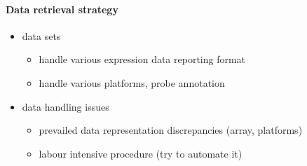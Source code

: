 






\paragraph{Data retrieval strategy}
%
%
\begin{itemize}
\item data sets
  \begin{itemize}
    \item handle various expression data reporting format
    \item handle various platforms, probe annotation
  \end{itemize}
\item data handling issues
  \begin{itemize}
    \item prevailed data representation discrepancies (array, platforms)
    \item labour intensive procedure (try to automate it)
  \end{itemize}
\end{itemize}



